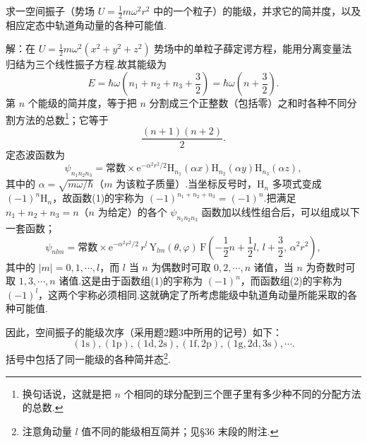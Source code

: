 \begin{xiti}
\quad 求一空间振子（势场 $U=\frac{1}{2}m\omega^2r^2$ 中的一个粒子）的能级，并求它的简并度，以及相应定态中轨道角动量的各种可能值.

解：在 $U=\frac{1}{2}m\omega^2(x^2+y^2+z^2)$ 势场中的单粒子薛定谔方程，能用分离变量法归结为三个线性振子方程.故其能级为
\begin{equation*}
  E=\hbar\omega\left(n_1+n_2+n_3+\frac{3}{2}\right)
  =\hbar\omega\left(n+\frac{3}{2}\right).
\end{equation*}
第 $n$ 个能级的简并度，等于把 $n$ 分割成三个正整数（包括零）之和时各种不同分割方法的总数\footnote{换句话说，这就是把 $n$ 个相同的球分配到三个匣子里有多少种不同的分配方法的总数.}；它等于
\begin{equation*}
  \frac{(n+1)(n+2)}{2}.
\end{equation*}
定态波函数为
\setcounter{equation}{0}%
\begin{equation}
  \psi_{n_1n_2n_3}=\text{常数}\times\mathrm{e}^{-\alpha^2r^2/2}
  \mathrm{H}_{n_1}(\alpha x)\mathrm{H}_{n_2}(\alpha y)\mathrm{H}_{n_3}(\alpha z),
\end{equation}
其中的 $\alpha=\sqrt{m\omega/\hbar}$（$m$ 为该粒子质量）.当坐标反号时，$\mathrm{H}_n$ 多项式变成 $(-1)^n\mathrm{H}_n$，故函数(1)的宇称为 $(-1)^{n_1+n_2+n_3}=(-1)^n$.把满足 $n_1+n_2+n_3=n$（$n$ 为给定）的各个 $\psi_{n_1n_2n_3}$ 函数加以线性组合后，可以组成以下一套函数；
\begin{equation}
  \psi_{nlm}=\text{常数}\times\mathrm{e}^{-\alpha^2r^2/2}\,r^l\,
  \mathrm{Y}_{lm}(\theta,\varphi)\,
  \mathrm{F}\left(-\frac{1}{2}n+\frac{1}{2}l,\,l+\frac{3}{2},\,\alpha^2r^2\right),
\end{equation}
其中的 $|m|=0,1,\cdots,l$，而 $l$ 当 $n$ 为偶数时可取 $0,2,\cdots,n$ 诸值，当 $n$ 为奇数时可取 $1,3,\cdots,n$ 诸值.这是由于函数组(1)的宇称为 $(-1)^n$，而函数组(2)的宇称为 $(-1)^l$，这两个宇称必须相同.这就确定了所考虑能级中轨道角动量所能采取的各种可能值.

因此，空间振子的能级次序（采用题2题3中所用的记号）如下：
\begin{equation*}
  (1\mathrm{s}),(1\mathrm{p}),(1\mathrm{d},2\mathrm{s}),
  (1\mathrm{f},2\mathrm{p}),(1\mathrm{g},2\mathrm{d},3\mathrm{s}),\cdots.
\end{equation*}
括号中包括了同一能级的各种简并态\footnote{注意角动量 $l$ 值不同的能级相互简并；见§36 末段的附注.}.

\end{xiti}
\renewcommand{\theequation}{\arabic{section}.\arabic{equation}}%

